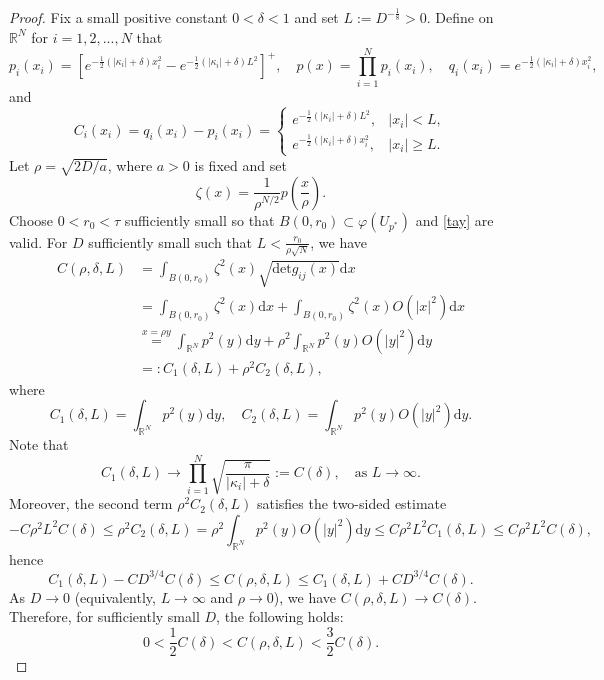 \documentclass[12pt,reqno]{amsart}
\newcommand{\R}{\mathbb{R}}
\numberwithin{equation}{section}
\begin{document}
\begin{proof}
Fix a small positive constant \(0<\delta < 1\) and set \( L :=D^{-\frac{1}{8}}>0\). Define on \(\R^N\) for $i=1,2,...,N$ that 
\[
p_i(x_i) = \left[ e^{-\frac{1}{2}(|\kappa_i| + \delta) x_i^2} - e^{-\frac{1}{2}(|\kappa_i| + \delta) L^2} \right]^+,\quad p(x) = \prod_{i=1}^N p_i(x_i),\quad q_i(x_i)=e^{-\frac{1}{2}(|\kappa_i| + \delta) x_i^2},
\]
and
\begin{equation} \label{Ci}
        C_i(x_i)=q_i(x_i)-p_i(x_i)=
\begin{cases}
e^{-\frac12(|\kappa_i|+\delta)L^2}, & |x_i|<L,\\[1ex]
e^{-\frac12(|\kappa_i|+\delta)x_i^2}, & |x_i|\ge L.
\end{cases}
\end{equation}
Let \(\rho = \sqrt{2D/a}\), where $a>0$ is fixed and set
\[
\zeta(x) = \frac{1}{\rho^{N/2}} p\left( \frac{x}{\rho} \right).
\]
Choose \(0<r_0<\tau\) sufficiently small so that \(B(0, r_0) \subset \varphi(U_{p^*})\) and \eqref{tay} are valid. For \(D\) sufficiently small such that \( L < \frac{r_0}{\rho \sqrt{N}}\), we have
\begin{align}
 C(\rho, \delta, L) &= \int_{B(0, r_0)} \zeta^2(x)\sqrt{\mathrm{det}g_{ij}(x)}\mathrm{d} x\nonumber\\
&= \int_{B(0, r_0)} \zeta^2(x)\mathrm{d} x+\int_{B(0, r_0)} \zeta^2(x)O(|x|^2)\mathrm{d} x\nonumber\\
 &\overset{x=\rho y}{=}\int_{\mathbb{R}^N} p^2(y) \mathrm{d}y+\rho^2\int_{\mathbb{R}^N} p^2(y) O(|y|^2)\mathrm{d}y\nonumber\\
 &=:C_1(\delta,L)+\rho^2C_2(\delta,L),
\end{align}
where
$$C_1(\delta,L)=\int_{\mathbb{R}^N} p^2(y) \mathrm{d}y,\quad C_2(\delta,L)=\int_{\mathbb{R}^N} p^2(y) O(|y|^2)\mathrm{d}y.$$
Note that 
$$C_1(\delta,L)\to {\prod_{i=1}^N\sqrt{\frac{\pi}{|\kappa_i|+\delta}}}:=C(\delta), \quad \text{as } L\to\infty.$$ 
Moreover, the second term $\rho^2C_2(\delta,L)$ satisfies the two-sided estimate 
$$-C\rho^2L^2C(\delta)\le \rho^2C_2(\delta,L)=\rho^2\int_{\mathbb{R}^N} p^2(y) O(|y|^2)\mathrm{d}y\le C\rho^2L^2C_1(\delta,L)\le C\rho^2L^2C(\delta),$$
hence
$$
C_1(\delta, L)-C D^{3/4}C(\delta)\leq C(\rho,\delta,L)\leq C_1(\delta, L)+C D^{3/4}C(\delta).
$$
As $D\to0$ (equivalently, $L\to \infty$ and $\rho\to0$), we have $C(\rho,\delta,L)\to C(\delta)$. Therefore, for sufficiently small $D$, the following holds:
$$0<\frac{1}{2}C(\delta)<C(\rho,\delta,L)<\frac{3}{2}C(\delta).$$



\end{proof}
\end{document}
